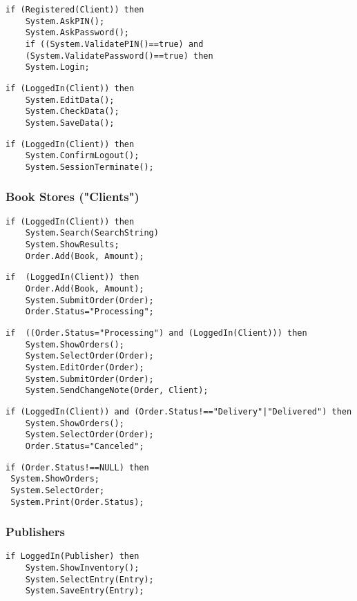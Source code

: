 \begin{lstlisting}[caption=/PF03/ Login]
 if (Registered(Client)) then
 	System.AskPIN();
 	System.AskPassword();
 	if ((System.ValidatePIN()==true) and
 	(System.ValidatePassword()==true) then
 	System.Login;
\end{lstlisting}

\begin{lstlisting}[caption=/PF04/ Update Account Information]
 if (LoggedIn(Client)) then
 	System.EditData();
 	System.CheckData();
 	System.SaveData();
\end{lstlisting}

\begin{lstlisting}[caption=/PF05/ Logout]
 if (LoggedIn(Client)) then
 	System.ConfirmLogout();
 	System.SessionTerminate();
\end{lstlisting}

\subsubsection{Book Stores ("Clients")}

\begin{lstlisting}[caption=/PF40/ Search for a Book / Show Catalogue]
 if (LoggedIn(Client)) then
 	System.Search(SearchString)
 	System.ShowResults;
 	Order.Add(Book, Amount);
\end{lstlisting}

\begin{lstlisting}[caption=/PF17/ Book Store Order via Web Interface]
if  (LoggedIn(Client)) then
	Order.Add(Book, Amount);
	System.SubmitOrder(Order);
	Order.Status="Processing";
\end{lstlisting}

\begin{lstlisting}[caption=/PF18/ Change Order]
if  ((Order.Status="Processing") and (LoggedIn(Client))) then
	System.ShowOrders();
	System.SelectOrder(Order);
	System.EditOrder(Order);
	System.SubmitOrder(Order);
	System.SendChangeNote(Order, Client);
\end{lstlisting}

\begin{lstlisting}[caption=/PF19/ Cancel Order]
if (LoggedIn(Client)) and (Order.Status!=="Delivery"|"Delivered") then
	System.ShowOrders();
	System.SelectOrder(Order);
	Order.Status="Canceled";
\end{lstlisting}

\begin{lstlisting}[caption=/PF50/ Tracking System]
 if (Order.Status!==NULL) then
 System.ShowOrders;
 System.SelectOrder;
 System.Print(Order.Status);
\end{lstlisting}

\subsubsection{Publishers}

\begin{lstlisting}[caption=/PF60/ Inventory Maintenance]
 if LoggedIn(Publisher) then
 	System.ShowInventory();
 	System.SelectEntry(Entry);
 	System.SaveEntry(Entry);
\end{lstlisting}